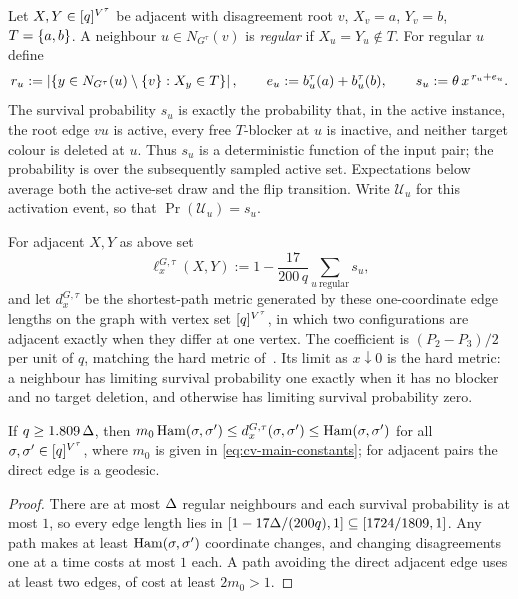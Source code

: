 Let \(X,Y\in[q]^{V^\tau}\) be adjacent with disagreement root \(v\),
\(X_v=a\), \(Y_v=b\),
$T=\left\{a,b\right\}$. A neighbour $u\in N_{G^\tau}(v)$ is \emph{regular} if
$X_u=Y_u\notin T$. For regular $u$ define
\begin{equation}\label{eq:cv-scores}
  r_u:=\left|\left\{y\in N_{G^\tau}(u)\setminus\left\{v\right\}:X_y\in T\right\}\right|,\qquad
  e_u:=b_u^\tau(a)+b_u^\tau(b),\qquad
  s_u:=\theta\,x^{\,r_u+e_u}.
\end{equation}
The survival probability $s_u$ is exactly the probability that, in the
active instance,
the root edge $vu$ is active, every free $T$-blocker at $u$ is inactive,
and neither target colour is deleted at $u$.  Thus $s_u$ is a
deterministic function of the input pair; the probability is
over the subsequently sampled active set. Expectations below average both the
active-set draw and the flip transition.
Write \(\mathcal U_u\) for this activation event, so that
\(\Pr(\mathcal U_u)=s_u\).

\begin{definition}\label{def:cv-metric}
For adjacent $X,Y$ as above set
\begin{equation}\label{eq:cv-edge-length}
  \ell_x^{G,\tau}(X,Y):=1-\frac{17}{200\,q}\sum_{u\ \text{regular}}s_u ,
\end{equation}
and let $d_x^{G,\tau}$ be the shortest-path metric generated by these
one-coordinate edge lengths on the graph with vertex set
\([q]^{V^\tau}\), in which two configurations are adjacent exactly when
they differ at one vertex. The
coefficient is $(P_2-P_3)/2$ per unit of $q$, matching the hard metric
of~\cite[Eq.~(2)]{CarlsonVigoda2024}. Its limit as $x\downarrow0$ is the
hard metric: a neighbour has limiting survival probability one exactly when it has no blocker
and no target deletion, and otherwise has limiting survival probability zero.
\end{definition}

\begin{lemma}\label{lem:cv-metric}
If $q\ge1.809\,\Delta$, then
$m_0\operatorname{Ham}(\sigma,\sigma')\le d_x^{G,\tau}(\sigma,\sigma')\le\operatorname{Ham}(\sigma,\sigma')$ for
all \(\sigma,\sigma'\in[q]^{V^\tau}\), where \(m_0\) is given in
\eqref{eq:cv-main-constants}; for adjacent pairs the direct edge is a geodesic.
\end{lemma}

\begin{proof}
There are at most $\Delta$ regular neighbours and each survival probability is at most $1$,
so every edge length lies in
$[1-17\Delta/(200q),1]\subseteq[1724/1809,1]$. Any path makes at least
$\operatorname{Ham}(\sigma,\sigma')$ coordinate changes, and changing disagreements one at a
time costs at most $1$ each. A path avoiding the direct adjacent edge uses
at least two edges, of cost at least $2m_0>1$.
\end{proof}

